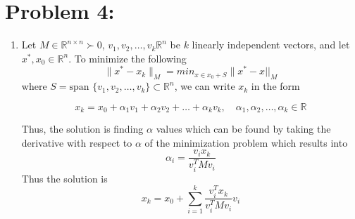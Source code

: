 \newpage
\section*{Problem 4:}
\begin{enumerate}
\item Let $M\in \mathbb{R}^{n\times n}\succ 0$, $v_{1}, v_{2}, \dots, v_{k}\mathbb{R}^{n}$ be $k$ linearly independent vectors, and let $x^{*}, x_{0} \in \mathbb{R}^{n}$. To minimize the following 
$$\parallel x^{*} - x_{k} \parallel_{M} = min_{x\in x_{0}+S} \parallel x^{*} -x||_{M}$$
where $S = \text{span }\{v_{1}, v_{2}, \dots, v_{k}\}\subset \mathbb{R}^{n}$, we can write $x_{k}$ in the form 

$$
x_{k} = x_{0} + \alpha_{1}v_{1} + \alpha_{2}v_{2} + \dots + \alpha_{k}v_{k}, \quad \alpha_{1},\alpha_{2}, \dots, \alpha_{k} \in \mathbb{R}
$$
%

Thus, the solution is finding $\alpha$ values which can be found by taking the derivative with respect to $\alpha$ of the minimization problem which results into 
$$\alpha_{i} = \frac{v_{i}x_{k}}{v_{i}^{T}Mv_{i}}$$
Thus the solution is 
$$x_{k} = x_{0} + \sum_{i=1}^{k}\frac{v_{i}^{T}x_{k}}{v_{i}^{T}Mv_{i}}v_{i}$$


\end{enumerate}